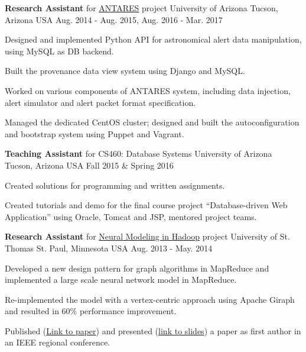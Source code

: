 \begin{cventries}
  \cventry
    {\textbf{Research Assistant} for \href{https://www.noao.edu/ANTARES/}{ANTARES} project} %
    {University of Arizona} %
    {Tucson, Arizona USA} %
    {Aug. 2014 - Aug. 2015, Aug. 2016 - Mar. 2017} %
    {
      \begin{cvitems} %
      \item {Designed and implemented Python API for astronomical
    alert data manipulation, using MySQL as DB backend.}
      \item {Built the provenance data view system using Django and MySQL.}
      \item {Worked on various components of ANTARES system,
    including data injection, alert simulator and alert packet format specification.}
        \item {Managed the dedicated CentOS cluster; designed and
    built the autoconfiguration and bootstrap 
    system using Puppet and Vagrant.}
      \end{cvitems}
    }

  \cventry
    {\textbf{Teaching Assistant} for CS460: Database Systems}
    {University of Arizona} %
    {Tucson, Arizona USA} %
    {Fall 2015 \& Spring 2016} %
    {
      \begin{cvitems} %
        \item {Created solutions for programming and written assignments.}
        \item {Created tutorials and demo for the final course project ``Database-driven Web
    Application'' using Oracle, Tomcat and JSP, mentored project teams.}
      \end{cvitems}
    }

  \cventry
    {\textbf{Research Assistant} for
    \href{http://imsure.github.io/NeuralGiraph/}{Neural Modeling in
    Hadoop} project}
    {University of St. Thomas} %
    {St. Paul, Minnesota USA} %
    {Aug. 2013 - May. 2014} %
    {
      \begin{cvitems} %
      \item {Developed a new design pattern for graph algorithms in
    MapReduce and implemented a large scale neural network
    model in MapReduce.}
      \item {Re-implemented the model with a vertex-centric approach
    using Apache Giraph and resulted in 60\% performance improvement.}
      \item
    {Published
    (\href{https://ieeexplore.ieee.org/document/6871824/}{Link to paper})
    and presented
    (\href{https://www.slideshare.net/imsure/ieee-eittalklargescaleneuralmodelinginmap-reducegiraph}{link
    to slides})
    a paper as first author in an IEEE regional conference.}
      \end{cvitems}
    }


\end{cventries}
